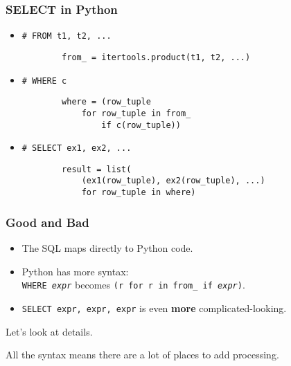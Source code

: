 \documentclass{beamer}
\begin{document}
\begin{frame}[fragile]
    \frametitle{SELECT in Python}

    \begin{itemize}
    \item[]
        \texttt{\# FROM t1, t2, ...}

        \begin{verbatim}
        from_ = itertools.product(t1, t2, ...)
        \end{verbatim}

        \vspace{1em}
    \item[]
        \texttt{\# WHERE c}

        \begin{verbatim}
        where = (row_tuple
            for row_tuple in from_
                if c(row_tuple))
        \end{verbatim}

        \vspace{1em}
    \item[]
        \texttt{\# SELECT ex1, ex2, ...}

        \begin{verbatim}
        result = list(
            (ex1(row_tuple), ex2(row_tuple), ...)
            for row_tuple in where)
        \end{verbatim}

    \end{itemize}

\end{frame}

\begin{frame}
    \frametitle{Good and Bad}

    \begin{itemize}
    \item The SQL maps directly to Python code.

    \item Python has more syntax: \\ \texttt{WHERE \textit{expr}} becomes \texttt{(r for r in from\_ if \textit{expr})}.

    \item \texttt{SELECT expr, expr, expr} is even \textbf{more} complicated-looking.
    \end{itemize}

    \vspace{1em}
    Let's look at details.

    All the syntax means there are a lot of places to add processing.
\end{frame}
\end{document}
